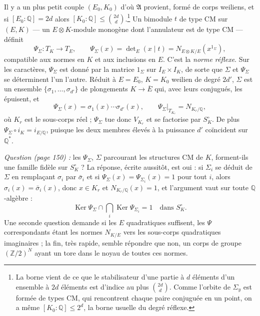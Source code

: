 \documentclass[11pt,a4paper]{article}
\begin{document}
Il y a un plus petit couple $(E_{0}, K_{0})$ d'où $\mathfrak{A}$ provient, formé
de corps weiliens, et si $[E_{0} : \mathbb{Q}] = 2d$ alors $[K_{0} : \mathbb{Q}]
\leqslant \binom{2d}{d}$.\footnote{La borne vient de ce que le stabilisateur
d'une partie à $d$ éléments d'un ensemble à $2d$ éléments est d'indice au plus
$\binom{2d}{d}$. Comme l'orbite de $\Sigma_{y}$ est formée de types CM, qui
rencontrent chaque paire conjuguée en un point, on a même $[K_{0} : \mathbb{Q}]
\leqslant 2^{d}$, la borne usuelle du degré réflexe.} Un bimodule $t$ de type CM
sur $(E, K)$ --- un $E \otimes K$-module monogène dont l'annulateur est de type
CM --- définit
\[
  \Psi_{\Sigma} \colon T_{K} \longrightarrow T_{E}, \qquad \Psi_{\Sigma}(x) =
  \det\nolimits_{E}(x \mid t) = N_{E \otimes K/E}(x^{1_{\Sigma}}) ,
\]
compatible aux normes en $K$ et aux inclusions en $E$. C'est la \emph{norme
réflexe}. Sur les caractères, $\Psi_{\Sigma}$ est donné par la matrice
$1_{\Sigma}$ sur $I_{E} \times I_{K}$, de sorte que $\Sigma$ et $\Psi_{\Sigma}$
se déterminent l'un l'autre. Réduit à $E = E_{0}$, $K = K_{0}$ weilien de degré
$2d'$, $\Sigma$ est un ensemble $\{\sigma_{1}, \ldots, \sigma_{d'}\}$ de
plongements $K \to \overline{E}$ qui, avec leurs conjugués, les épuisent, et
\[
  \Psi_{\Sigma}(x) = \sigma_{1}(x) \cdots \sigma_{d'}(x) , \qquad
  \Psi_{\Sigma}|_{T_{K_{r}}} = N_{K_{r}/\mathbb{Q}} ,
\]
où $K_{r}$ est le sous-corps réel ; $\Psi_{\Sigma}$ tue donc $V_{K_{r}}$ et se
factorise par $S^{\circ}_{K}$. De plus $\Psi_{\Sigma} \circ i_{K} =
i_{E/\mathbb{Q}}$, puisque les deux membres élevés à la puissance $d'$ coïncident
sur $\mathbb{Q}^{*}$.

\emph{Question (page 150) :} les $\Psi_{\Sigma}$, $\Sigma$ parcourant les
structures CM de $K$, forment-ils une famille fidèle sur $S^{\circ}_{K}$ ? La
réponse, écrite aussitôt, est oui : si $\Sigma_{i}$ se déduit de $\Sigma$ en
remplaçant $\sigma_{i}$ par $\bar{\sigma}_{i}$ et si $\Psi_{\Sigma}(x) =
\Psi_{\Sigma_{i}}(x) = 1$ pour tout $i$, alors $\sigma_{i}(x) =
\bar{\sigma}_{i}(x)$, donc $x \in K_{r}$ et $N_{K_{r}/\mathbb{Q}}(x) = 1$, et
l'argument vaut sur toute $\mathbb{Q}$-algèbre :
\[
  \operatorname{Ker}\Psi_{\Sigma} \cap \bigcap_{i}
  \operatorname{Ker}\Psi_{\Sigma_{i}} = 1 \quad \text{dans } S^{\circ}_{K} .
\]
Une seconde question demande si les $E$ quadratiques suffisent, les
$\Psi$ correspondants étant les normes $N_{K/E}$ vers les sous-corps quadratiques
imaginaires ; la fin, très rapide, semble répondre que non, un corps de groupe
$(\mathbb{Z}/2)^{N}$ ayant un tore dans le noyau de toutes ces normes.
\end{document}
